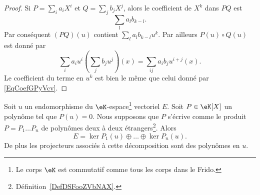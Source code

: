 \begin{proof}
	Si \( P=\sum_i a_iX^i\) et \( Q=\sum_j b_jX^j\), alors le coefficient de \( X^k\) dans \( PQ\) est
	\begin{equation}        \label{EqCoefGPyVcv}
		\sum_la_lb_{k-l}.
	\end{equation}
	Par conséquent \( (PQ)(u)\) contient \( \sum_la_lb_{k-l}u^k\). Par ailleurs \( P(u)\circ Q(u)\) est donné par
	\begin{equation}
		\sum_ia_iu^i\left( \sum_jb_ju^j \right)(x)=\sum_{ij}a_ib_ju^{i+j}(x).
	\end{equation}
	Le coefficient du terme en \( u^k\) est bien le même que celui donné par \eqref{EqCoefGPyVcv}.
\end{proof}

\begin{theorem}       \label{ThoDecompNoyayzzMWod}
	Soit \( u\) un endomorphisme du \( \eK\)-espace\footnote{Le corps \( \eK\) est commutatif comme tous les corps dans le Frido.} vectoriel \( E\). Soit \( P\in\eK[X]\) un polynôme tel que \( P(u)=0\). Nous supposons que \( P\) s'écrive comme le produit \( P=P_1\ldots P_n\) de polynômes deux à deux étrangers\footnote{Définition~\ref{DefDSFooZVbNAX}.}. Alors
	\begin{equation}
		E=\ker P_1(u)\oplus\ldots\oplus\ker P_n(u).
	\end{equation}
	De plus les projecteurs associés à cette décomposition sont des polynômes en \( u\).
\end{theorem}

